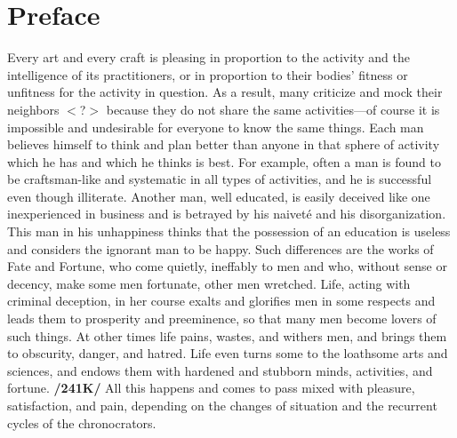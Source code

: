 \section{Preface}

Every art and every craft is pleasing in proportion to the activity and the intelligence of its practitioners, or in proportion to their bodies’ fitness or unfitness for the activity in question. As a result, many criticize and mock their neighbors $<$?$>$ because they do not share the same activities—of course it is impossible and undesirable for everyone to know the same things. Each man believes himself to think and
plan better than anyone in that sphere of activity which he has and which he thinks is best. For example, often a man is found to be craftsman-like and systematic in all types of activities, and he is successful even though illiterate. Another man, well educated, is easily deceived like one inexperienced in business and is betrayed by his naiveté and his disorganization. This man in his unhappiness thinks that the possession of an education is useless and considers the ignorant man to be happy. Such differences are the works of Fate and Fortune, who come quietly, ineffably to men and who, without sense or decency, make some men fortunate, other men wretched. Life, acting with criminal deception, in her course exalts and glorifies men in some respects and leads them to prosperity and preeminence, so that many men become lovers of such things. At other times life pains, wastes, and withers men, and brings them to obscurity, danger, and hatred. Life even turns some to the loathsome arts and sciences, and endows them with hardened and stubborn minds, activities, and fortune. \textbf{/241K/} All this happens and comes to pass mixed with pleasure, satisfaction, and pain, depending on the changes of
situation and the recurrent cycles of the chronocrators. 

